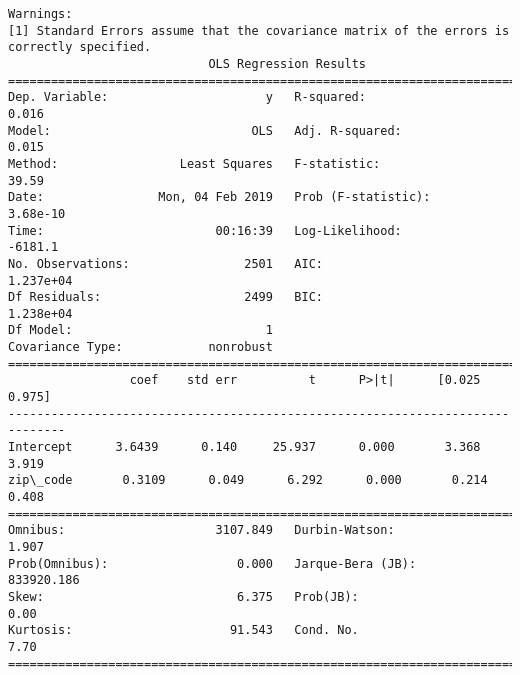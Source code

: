 \documentclass[11pt]{article}
\begin{document}
\begin{Verbatim}[commandchars=\\\{\}]
Warnings:
[1] Standard Errors assume that the covariance matrix of the errors is correctly specified.
                            OLS Regression Results                            
==============================================================================
Dep. Variable:                      y   R-squared:                       0.016
Model:                            OLS   Adj. R-squared:                  0.015
Method:                 Least Squares   F-statistic:                     39.59
Date:                Mon, 04 Feb 2019   Prob (F-statistic):           3.68e-10
Time:                        00:16:39   Log-Likelihood:                -6181.1
No. Observations:                2501   AIC:                         1.237e+04
Df Residuals:                    2499   BIC:                         1.238e+04
Df Model:                           1                                         
Covariance Type:            nonrobust                                         
==============================================================================
                 coef    std err          t      P>|t|      [0.025      0.975]
------------------------------------------------------------------------------
Intercept      3.6439      0.140     25.937      0.000       3.368       3.919
zip\_code       0.3109      0.049      6.292      0.000       0.214       0.408
==============================================================================
Omnibus:                     3107.849   Durbin-Watson:                   1.907
Prob(Omnibus):                  0.000   Jarque-Bera (JB):           833920.186
Skew:                           6.375   Prob(JB):                         0.00
Kurtosis:                      91.543   Cond. No.                         7.70
==============================================================================


\end{Verbatim}
\end{document}
